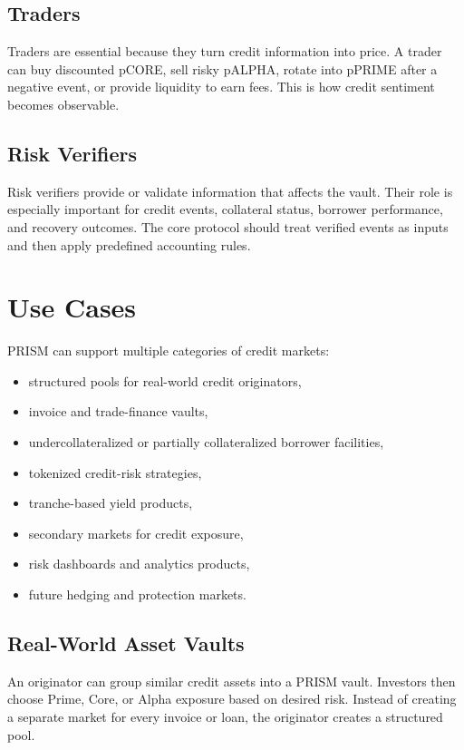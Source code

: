 \documentclass[11pt]{article}
\begin{document}
\subsection{Traders}

Traders are essential because they turn credit information into price. A trader
can buy discounted pCORE, sell risky pALPHA, rotate into pPRIME after a negative
event, or provide liquidity to earn fees. This is how credit sentiment becomes
observable.

\subsection{Risk Verifiers}

Risk verifiers provide or validate information that affects the vault. Their role
is especially important for credit events, collateral status, borrower
performance, and recovery outcomes. The core protocol should treat verified
events as inputs and then apply predefined accounting rules.

\section{Use Cases}

PRISM can support multiple categories of credit markets:

\begin{itemize}
  \item structured pools for real-world credit originators,
  \item invoice and trade-finance vaults,
  \item undercollateralized or partially collateralized borrower facilities,
  \item tokenized credit-risk strategies,
  \item tranche-based yield products,
  \item secondary markets for credit exposure,
  \item risk dashboards and analytics products,
  \item future hedging and protection markets.
\end{itemize}

\subsection{Real-World Asset Vaults}

An originator can group similar credit assets into a PRISM vault. Investors then
choose Prime, Core, or Alpha exposure based on desired risk. Instead of creating
a separate market for every invoice or loan, the originator creates a structured
pool.
\end{document}
